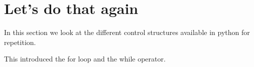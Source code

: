 \section{Let's do that again} \label{sec:ControlLoops}

In this section we look at the different control structures available in python for repetition.

This introduced the for loop and the while operator.